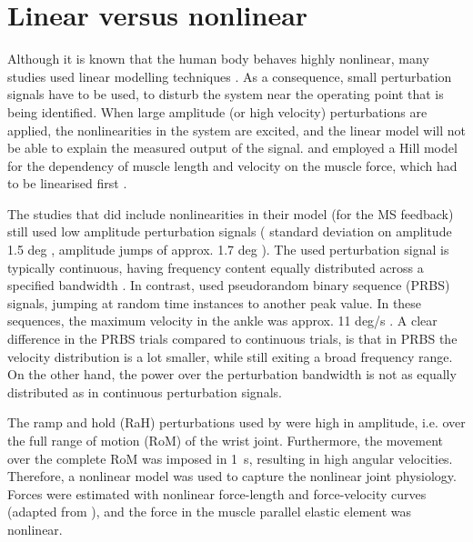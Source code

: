 \section{Linear versus nonlinear}
Although it is known that the human body behaves highly nonlinear, many studies used linear modelling techniques \cite{van_der_helm_identification_2002, schouten_nmclab_2008, mugge_rigorous_2010}. As a consequence, small perturbation signals have to be used, to disturb the system near the operating point that is being identified. When large amplitude (or high velocity) perturbations are applied, the nonlinearities in the system are excited, and the linear model will not be able to explain the measured output of the signal. \citeauthor{schouten_nmclab_2008} and \citeauthor{mugge_rigorous_2010} employed a Hill model for the dependency of muscle length and velocity on the muscle force, which had to be linearised first \cite{schouten_nmclab_2008, mugge_rigorous_2010}.

The studies that did include nonlinearities in their model (for the MS feedback) still used low amplitude perturbation signals (\citeauthor{zhang_simultaneous_1997} standard deviation on amplitude 1.5 deg \cite{zhang_simultaneous_1997}, \citeauthor{mirbagheri_intrinsic_2000} amplitude jumps of approx. 1.7 deg \cite{mirbagheri_intrinsic_2000}). The used perturbation signal is typically continuous, having frequency content equally distributed across a specified bandwidth \cite{zhang_simultaneous_1997, van_der_helm_identification_2002, schouten_nmclab_2008, mugge_sensory_2009}. In contrast, \citeauthor{mirbagheri_intrinsic_2000} used pseudorandom binary sequence (PRBS) signals, jumping at random time instances to another peak value. In these sequences, the maximum velocity in the ankle was approx. 11 deg/s \cite{mirbagheri_intrinsic_2000}. A clear difference in the PRBS trials compared to continuous trials, is that in PRBS the velocity distribution is a lot smaller, while still exiting a broad frequency range. On the other hand, the power over the perturbation bandwidth is not as equally distributed as in continuous perturbation signals. 

The ramp and hold (RaH) perturbations used by \citeauthor{de_gooijer-van_de_groep_estimation_2016} were high in amplitude, i.e. over the full range of motion (RoM) of the wrist joint. Furthermore, the movement over the complete RoM was imposed in \SI{1}{\second}, resulting in high angular velocities. Therefore, a nonlinear model was used to capture the nonlinear joint physiology. Forces were estimated with nonlinear force-length and force-velocity curves (adapted from \cite{thelen_adjustment_2003}), and the force in the muscle parallel elastic element was nonlinear. 



